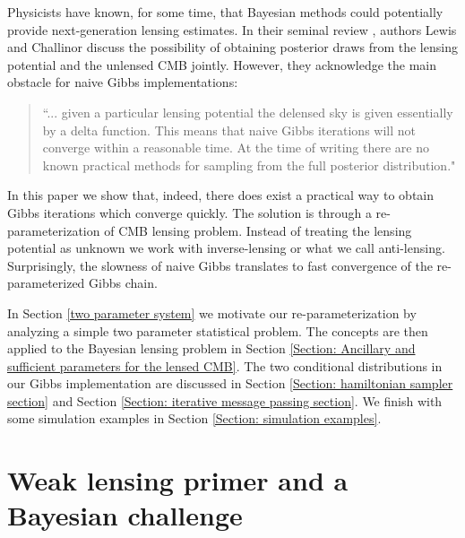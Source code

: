 \documentclass[noinfoline]{imsart}
\begin{document}
Physicists have known, for some time, that Bayesian methods could potentially provide next-generation lensing estimates. In their seminal review \cite{Lewis20061}, authors Lewis and Challinor  discuss the possibility of obtaining posterior draws from the lensing potential and the unlensed CMB jointly. However, they acknowledge the main obstacle for naive Gibbs implementations:
\begin{quote}
``... given a particular lensing potential the delensed sky is given essentially by a delta function.
This means that naive Gibbs iterations will not converge within a reasonable time. At the time of writing there are no known practical methods for sampling from the full posterior distribution."
\end{quote}
In this paper we show that, indeed, there does exist a practical way to obtain Gibbs iterations which converge quickly. The solution is through a re-parameterization of CMB lensing problem. Instead of treating the lensing potential as unknown we work with inverse-lensing or what we call anti-lensing. Surprisingly, the slowness of naive Gibbs translates to fast convergence of the re-parameterized Gibbs chain. 



In Section \ref{two parameter system} we motivate our re-parameterization by analyzing a simple two parameter statistical problem.  The concepts are then applied to the Bayesian lensing problem in Section \ref{Section: Ancillary and sufficient parameters for the lensed CMB}. The two conditional distributions in our Gibbs implementation are discussed in Section \ref{Section: hamiltonian sampler section} and Section \ref{Section: iterative message passing section}. We finish with some  simulation examples in Section \ref{Section: simulation examples}.




%
%
\section{Weak lensing primer and a Bayesian challenge}
\label{primer}
\end{document}
